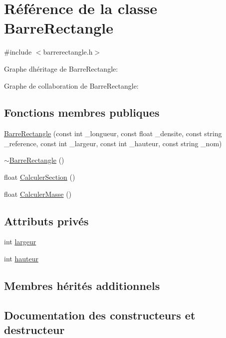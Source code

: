 \hypertarget{class_barre_rectangle}{}\section{Référence de la classe Barre\+Rectangle}
\label{class_barre_rectangle}


{\ttfamily \#include $<$barrerectangle.\+h$>$}



Graphe d\textquotesingle{}héritage de Barre\+Rectangle\+:


Graphe de collaboration de Barre\+Rectangle\+:
\subsection*{Fonctions membres publiques}
\begin{DoxyCompactItemize}
\item 
\hyperlink{class_barre_rectangle_a8ee995125c7e608c0e35e75adeb8dbc8}{Barre\+Rectangle} (const int \+\_\+longueur, const float \+\_\+densite, const string \+\_\+reference, const int \+\_\+largeur, const int \+\_\+hauteur, const string \+\_\+nom)
\item 
\hyperlink{class_barre_rectangle_aaf9fee36e7a6b914af9fc0bff25674e4}{$\sim$\+Barre\+Rectangle} ()
\item 
float \hyperlink{class_barre_rectangle_aca359a79b9e74a94867ccaa4341f51ae}{Calculer\+Section} ()
\item 
float \hyperlink{class_barre_rectangle_a9edb62e31a33790146eb0fd2b3fd7e4e}{Calculer\+Masse} ()
\end{DoxyCompactItemize}
\subsection*{Attributs privés}
\begin{DoxyCompactItemize}
\item 
int \hyperlink{class_barre_rectangle_a6805bad77d9cbdf787a911e0841d6d35}{largeur}
\item 
int \hyperlink{class_barre_rectangle_a784fbd74278ac6f35b8e2e90a1c6f0a6}{hauteur}
\end{DoxyCompactItemize}
\subsection*{Membres hérités additionnels}


\subsection{Documentation des constructeurs et destructeur}
\mbox{\label{class_barre_rectangle_a8ee995125c7e608c0e35e75adeb8dbc8}} 
